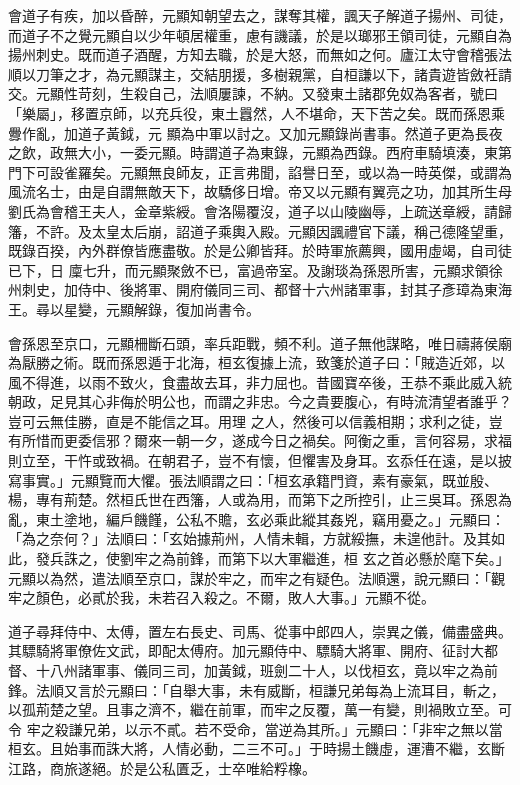 \begin{pinyinscope}
 會道子有疾，加以昏醉，元顯知朝望去之，謀奪其權，諷天子解道子揚州、司徒，而道子不之覺元顯自以少年頓居權重，慮有譏議，於是以瑯邪王領司徒，元顯自為揚州刺史。既而道子酒醒，方知去職，於是大怒，而無如之何。廬江太守會稽張法順以刀筆之才，為元顯謀主，交結朋援，多樹親黨，自桓謙以下，諸貴遊皆斂衽請交。元顯性苛刻，生殺自己，法順屢諫，不納。又發東土諸郡免奴為客者，號曰「樂屬」，移置京師，以充兵役，東土囂然，人不堪命，天下苦之矣。既而孫恩乘釁作亂，加道子黃鉞，元
 顯為中軍以討之。又加元顯錄尚書事。然道子更為長夜之飲，政無大小，一委元顯。時謂道子為東錄，元顯為西錄。西府車騎填湊，東第門下可設雀羅矣。元顯無良師友，正言弗聞，諂譽日至，或以為一時英傑，或謂為風流名士，由是自謂無敵天下，故驕侈日增。帝又以元顯有翼亮之功，加其所生母劉氏為會稽王夫人，金章紫綬。會洛陽覆沒，道子以山陵幽辱，上疏送章綬，請歸籓，不許。及太皇太后崩，詔道子乘輿入殿。元顯因諷禮官下議，稱己德隆望重，既錄百揆，內外群僚皆應盡敬。於是公卿皆拜。於時軍旅薦興，國用虛竭，自司徒已下，日
 廩七升，而元顯聚斂不已，富過帝室。及謝琰為孫恩所害，元顯求領徐州刺史，加侍中、後將軍、開府儀同三司、都督十六州諸軍事，封其子彥璋為東海王。尋以星變，元顯解錄，復加尚書令。



 會孫恩至京口，元顯柵斷石頭，率兵距戰，頻不利。道子無他謀略，唯日禱蔣侯廟為厭勝之術。既而孫恩遁于北海，桓玄復據上流，致箋於道子曰：「賊造近郊，以風不得進，以雨不致火，食盡故去耳，非力屈也。昔國寶卒後，王恭不乘此威入統朝政，足見其心非侮於明公也，而謂之非忠。今之貴要腹心，有時流清望者誰乎？豈可云無佳勝，直是不能信之耳。用理
 之人，然後可以信義相期；求利之徒，豈有所惜而更委信邪？爾來一朝一夕，遂成今日之禍矣。阿衡之重，言何容易，求福則立至，干忤或致禍。在朝君子，豈不有懷，但懼害及身耳。玄忝任在遠，是以披寫事實。」元顯覽而大懼。張法順謂之曰：「桓玄承籍門資，素有豪氣，既並殷、楊，專有荊楚。然桓氏世在西籓，人或為用，而第下之所控引，止三吳耳。孫恩為亂，東土塗地，編戶饑饉，公私不贍，玄必乘此縱其姦兇，竊用憂之。」元顯曰：「為之奈何？」法順曰：「玄始據荊州，人情未輯，方就綏撫，未遑他計。及其如此，發兵誅之，使劉牢之為前鋒，而第下以大軍繼進，桓
 玄之首必懸於麾下矣。」元顯以為然，遣法順至京口，謀於牢之，而牢之有疑色。法順還，說元顯曰：「觀牢之顏色，必貳於我，未若召入殺之。不爾，敗人大事。」元顯不從。



 道子尋拜侍中、太傅，置左右長史、司馬、從事中郎四人，崇異之儀，備盡盛典。其驃騎將軍僚佐文武，即配太傅府。加元顯侍中、驃騎大將軍、開府、征討大都督、十八州諸軍事、儀同三司，加黃鉞，班劍二十人，以伐桓玄，竟以牢之為前鋒。法順又言於元顯曰：「自舉大事，未有威斷，桓謙兄弟每為上流耳目，斬之，以孤荊楚之望。且事之濟不，繼在前軍，而牢之反覆，萬一有變，則禍敗立至。可令
 牢之殺謙兄弟，以示不貳。若不受命，當逆為其所。」元顯曰：「非牢之無以當桓玄。且始事而誅大將，人情必動，二三不可。」于時揚土饑虛，運漕不繼，玄斷江路，商旅遂絕。於是公私匱乏，士卒唯給粰橡。




\end{pinyinscope}
